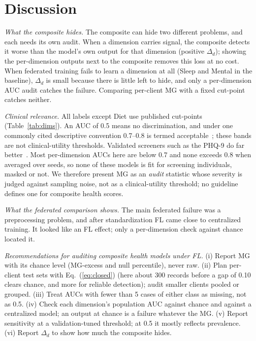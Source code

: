 \section{Discussion}

\emph{What the composite hides.} The composite can hide two different problems, and each needs its own audit. When a dimension carries signal, the composite detects it worse than the model's own output for that dimension (positive $\Delta_d$); showing the per-dimension outputs next to the composite removes this loss at no cost. When federated training fails to learn a dimension at all (Sleep and Mental in the baseline), $\Delta_d$ is small because there is little left to hide, and only a per-dimension AUC audit catches the failure. Comparing per-client MG with a fixed cut-point catches neither.

\emph{Clinical relevance.} All labels except Diet use published cut-points (Table~\ref{tab:dims}). An AUC of 0.5 means no discrimination, and under one commonly cited descriptive convention 0.7--0.8 is termed acceptable~\cite{mandrekar2010}; these bands are not clinical-utility thresholds. Validated screeners such as the PHQ-9 do far better~\cite{kroenke2001}. Most per-dimension AUCs here are below 0.7 and none exceeds 0.8 when averaged over seeds, so none of these models is fit for screening individuals, masked or not. We therefore present MG as an \emph{audit} statistic whose severity is judged against sampling noise, not as a clinical-utility threshold; no guideline defines one for composite health scores.

\emph{What the federated comparison shows.} The main federated failure was a preprocessing problem, and after standardization FL came close to centralized training. It looked like an FL effect; only a per-dimension check against chance located it.

\emph{Recommendations for auditing composite health models under FL.}
(i) Report MG with its chance level (MG-excess and null percentile), never raw. (ii) Plan per-client test sets with Eq.~(\ref{eq:closed}) (here about 300 records before a gap of 0.10 clears chance, and more for reliable detection); audit smaller clients pooled or grouped. (iii) Treat AUCs with fewer than 5 cases of either class as missing, not as 0.5. (iv) Check each dimension's population AUC against chance and against a centralized model; an output at chance is a failure whatever the MG. (v) Report sensitivity at a validation-tuned threshold; at 0.5 it mostly reflects prevalence. (vi) Report $\Delta_d$ to show how much the composite hides.

